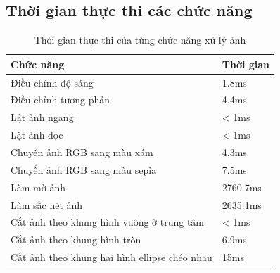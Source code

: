 \subsection{Thời gian thực thi các chức năng}
\begin{table}[H]
	\centering
	\renewcommand{\arraystretch}{1.3}
	\caption{Thời gian thực thi của từng chức năng xử lý ảnh}
	\begin{tabular}{|p{10cm}|>{\raggedleft\arraybackslash}p{2cm}|}
		\hline
		\textbf{Chức năng}                            & \textbf{Thời gian} \\
		\hline
		Điều chỉnh độ sáng                            & 1.8ms              \\
		\hline
		Điều chỉnh tương phản                         & 4.4ms              \\
		\hline
		Lật ảnh ngang                                 & < 1ms              \\
		\hline
		Lật ảnh dọc                                   & < 1ms              \\
		\hline
		Chuyển ảnh RGB sang màu xám                   & 4.3ms              \\
		\hline
		Chuyển ảnh RGB sang màu sepia                 & 7.5ms              \\
		\hline
		Làm mờ ảnh                                    & 2760.7ms           \\
		\hline
		Làm sắc nét ảnh                               & 2635.1ms           \\
		\hline
		Cắt ảnh theo khung hình vuông ở trung tâm     & < 1ms              \\
		\hline
		Cắt ảnh theo khung hình tròn                  & 6.9ms              \\
		\hline
		Cắt ảnh theo khung hai hình ellipse chéo nhau & 15ms               \\
		\hline
	\end{tabular}
\end{table}

